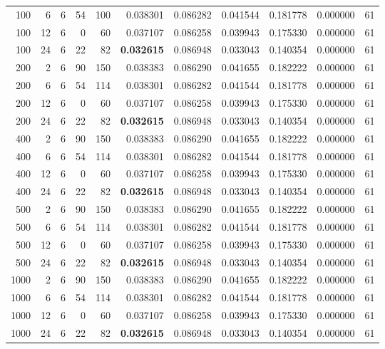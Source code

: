 \begin{table}
\begin{tabular}{rrrrrrrrrrr}
100 & 6 & 6 & 54 & 100 & 0.038301 & 0.086282 & 0.041544 & 0.181778 & 0.000000 & 61 \\
100 & 12 & 6 & 0 & 60 & 0.037107 & 0.086258 & 0.039943 & 0.175330 & 0.000000 & 61 \\
100 & 24 & 6 & 22 & 82 & \textbf{0.032615} & 0.086948 & 0.033043 & 0.140354 & 0.000000 & 61 \\
200 & 2 & 6 & 90 & 150 & 0.038383 & 0.086290 & 0.041655 & 0.182222 & 0.000000 & 61 \\
200 & 6 & 6 & 54 & 114 & 0.038301 & 0.086282 & 0.041544 & 0.181778 & 0.000000 & 61 \\
200 & 12 & 6 & 0 & 60 & 0.037107 & 0.086258 & 0.039943 & 0.175330 & 0.000000 & 61 \\
200 & 24 & 6 & 22 & 82 & \textbf{0.032615} & 0.086948 & 0.033043 & 0.140354 & 0.000000 & 61 \\
400 & 2 & 6 & 90 & 150 & 0.038383 & 0.086290 & 0.041655 & 0.182222 & 0.000000 & 61 \\
400 & 6 & 6 & 54 & 114 & 0.038301 & 0.086282 & 0.041544 & 0.181778 & 0.000000 & 61 \\
400 & 12 & 6 & 0 & 60 & 0.037107 & 0.086258 & 0.039943 & 0.175330 & 0.000000 & 61 \\
400 & 24 & 6 & 22 & 82 & \textbf{0.032615} & 0.086948 & 0.033043 & 0.140354 & 0.000000 & 61 \\
500 & 2 & 6 & 90 & 150 & 0.038383 & 0.086290 & 0.041655 & 0.182222 & 0.000000 & 61 \\
500 & 6 & 6 & 54 & 114 & 0.038301 & 0.086282 & 0.041544 & 0.181778 & 0.000000 & 61 \\
500 & 12 & 6 & 0 & 60 & 0.037107 & 0.086258 & 0.039943 & 0.175330 & 0.000000 & 61 \\
500 & 24 & 6 & 22 & 82 & \textbf{0.032615} & 0.086948 & 0.033043 & 0.140354 & 0.000000 & 61 \\
1000 & 2 & 6 & 90 & 150 & 0.038383 & 0.086290 & 0.041655 & 0.182222 & 0.000000 & 61 \\
1000 & 6 & 6 & 54 & 114 & 0.038301 & 0.086282 & 0.041544 & 0.181778 & 0.000000 & 61 \\
1000 & 12 & 6 & 0 & 60 & 0.037107 & 0.086258 & 0.039943 & 0.175330 & 0.000000 & 61 \\
1000 & 24 & 6 & 22 & 82 & \textbf{0.032615} & 0.086948 & 0.033043 & 0.140354 & 0.000000 & 61 \\
\bottomrule
\end{tabular}
\end{table}

